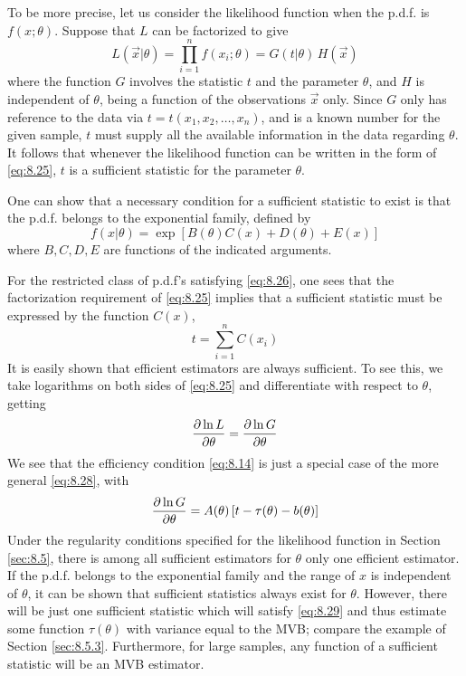 \documentclass[../main.tex]{subfiles}
\begin{document}
To be more precise,
let us consider the likelihood function when the p.d.f. is $f(x;\theta)$.
Suppose that $L$ can be factorized to give
%
\begin{equation}
    L(\vec{x}|\theta)
    = \prod_{i=1}^n f(x_i;\theta)
    = G(t|\theta) \, H(\vec{x})
    \label{eq:8.25}
\end{equation}
%
where the function $G$ involves the statistic $t$ and the parameter $\theta$,
and $H$ is independent of $\theta$,
being a function of the observations $\vec{x}$ only.
Since $G$ only has reference to the data via $t = t(x_1,x_2,\ldots,x_n)$,
and is a known number for the given sample,
$t$ must supply all the available information in the data regarding $\theta$.
It follows that whenever the likelihood function can be written in the form of \eqref{eq:8.25},
$t$ is a sufficient statistic for the parameter $\theta$.

One can show that a necessary condition for a sufficient statistic to exist is that
the p.d.f. belongs to the exponential family,
defined by
%
\begin{equation}
    f(x|\theta)
    = \exp \left[ B(\theta)C(x) + D(\theta) + E(x) \right]
    \label{eq:8.26}
\end{equation}
%
where $B,C,D,E$ are functions of the indicated arguments.

For the restricted class of p.d.f's satisfying \eqref{eq:8.26},
one sees that the factorization requirement of \eqref{eq:8.25}
implies that a sufficient statistic must be expressed by the function $C(x)$,
%
\begin{equation}
    t = \sum_{i=1}^n C(x_i)
    \label{eq:8.27}
\end{equation}
%
It is easily shown that efficient estimators are always sufficient.
To see this,
we take logarithms on both sides of \eqref{eq:8.25}
and differentiate with respect to $\theta$,
getting
%
\begin{equation}
    \frac{\partial \ln L}{\partial \theta} = \frac{\partial \ln G}{\partial \theta}
    \label{eq:8.28}
\end{equation}
%
We see that the efficiency condition \eqref{eq:8.14}
is just a special case of the more general \eqref{eq:8.28}, with
%
\begin{equation}
    \frac{\partial \ln G}{\partial \theta} = A(\theta) \left[ t - \tau(\theta) - b(\theta) \right]
    \label{eq:8.29}
\end{equation}
%
Under the regularity conditions specified for the likelihood function in Section \ref{sec:8.5},
there is among all sufficient estimators for $\theta$ only one efficient estimator.
If the p.d.f. belongs to the exponential family
and the range of $x$ is independent of $\theta$,
it can be shown that sufficient statistics always exist for $\theta$.
However, there will be just one sufficient statistic which will satisfy \eqref{eq:8.29}
and thus estimate some function $\tau(\theta)$ with variance equal to the MVB;
compare the example of Section \ref{sec:8.5.3}.
Furthermore, for large samples, any function of a sufficient statistic will be an MVB estimator.
\end{document}
